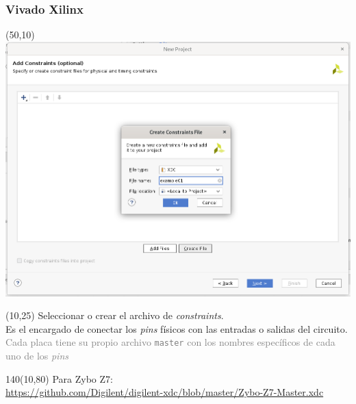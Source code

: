 \documentclass[aspectratio=169]{beamer}
\begin{document}
\begin{frame}[fragile,t]
    \frametitle{Vivado Xilinx}
    \begin{textblock}{75}(50,10) \includegraphics[scale=0.27]{img/vivado/07_add_constraints.png} \end{textblock}
    \begin{textblock}{38}(10,25) \small
    Seleccionar o crear el archivo de \emph{constraints}.\\
    \textcolor{verdeuca}{Es el encargado de conectar los \emph{pins} físicos con las entradas o salidas del circuito.}\\
    \textcolor{gray}{Cada placa tiene su propio archivo \texttt{master} con los nombres específicos de cada uno de los \emph{pins}}
    \end{textblock}
    \begin{textblock}{140}(10,80) \small
    Para Zybo Z7:\\
    \url{https://github.com/Digilent/digilent-xdc/blob/master/Zybo-Z7-Master.xdc}
    \end{textblock}
\end{frame}
    
\end{document}
